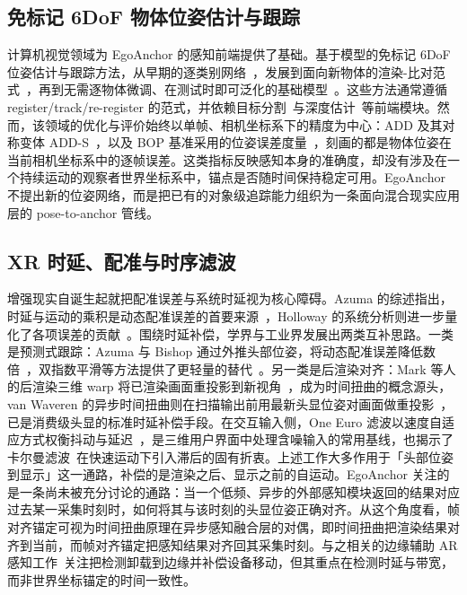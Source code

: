 \documentclass[review]{vgtc}
\begin{document}
\subsection{免标记 6DoF 物体位姿估计与跟踪}
计算机视觉领域为 EgoAnchor 的感知前端提供了基础。基于模型的免标记 6DoF 位姿估计与跟踪方法，从早期的逐类别网络~\cite{posecnn2017,densefusion2019}，发展到面向新物体的渲染-比对范式~\cite{cosypose2020,megapose2022}，再到无需逐物体微调、在测试时即可泛化的基础模型~\cite{foundationpose2023,bundlesdf2023}。这些方法通常遵循 register/track/re-register 的范式，并依赖目标分割~\cite{kirillov2023sam,cutie2024,sam3_2025,yoloe2025}与深度估计~\cite{foundationstereo2025}等前端模块。然而，该领域的优化与评价始终以单帧、相机坐标系下的精度为中心：ADD 及其对称变体 ADD-S~\cite{hinterstoisser2012add,posecnn2017}，以及 BOP 基准采用的位姿误差度量~\cite{hodan2020bop}，刻画的都是物体位姿在当前相机坐标系中的逐帧误差。这类指标反映感知本身的准确度，却没有涉及在一个持续运动的观察者世界坐标系中，锚点是否随时间保持稳定可用。EgoAnchor 不提出新的位姿网络，而是把已有的对象级追踪能力组织为一条面向混合现实应用层的 pose-to-anchor 管线。

\subsection{XR 时延、配准与时序滤波}
增强现实自诞生起就把配准误差与系统时延视为核心障碍。Azuma 的综述指出，时延与运动的乘积是动态配准误差的首要来源~\cite{azuma1997survey}，Holloway 的系统分析则进一步量化了各项误差的贡献~\cite{holloway1997registration}。围绕时延补偿，学界与工业界发展出两类互补思路。一类是预测式跟踪：Azuma 与 Bishop 通过外推头部位姿，将动态配准误差降低数倍~\cite{azuma1994improving}，双指数平滑等方法提供了更轻量的替代~\cite{laviola2003double}。另一类是后渲染对齐：Mark 等人的后渲染三维 warp 将已渲染画面重投影到新视角~\cite{mark1997postrendering}，成为时间扭曲的概念源头，van Waveren 的异步时间扭曲则在扫描输出前用最新头显位姿对画面做重投影~\cite{vanwaveren2016atw}，已是消费级头显的标准时延补偿手段。在交互输入侧，One Euro 滤波以速度自适应方式权衡抖动与延迟~\cite{casiez2012oneeuro}，是三维用户界面中处理含噪输入的常用基线，也揭示了卡尔曼滤波~\cite{kalman1960new}在快速运动下引入滞后的固有折衷。上述工作大多作用于「头部位姿到显示」这一通路，补偿的是渲染之后、显示之前的自运动。EgoAnchor 关注的是一条尚未被充分讨论的通路：当一个低频、异步的外部感知模块返回的结果对应过去某一采集时刻时，如何将其与该时刻的头显位姿正确对齐。从这个角度看，帧对齐锚定可视为时间扭曲原理在异步感知融合层的对偶，即时间扭曲把渲染结果对齐到当前，而帧对齐锚定把感知结果对齐回其采集时刻。与之相关的边缘辅助 AR 感知工作~\cite{liu2019edge,guan2022deepmix}关注把检测卸载到边缘并补偿设备移动，但其重点在检测时延与带宽，而非世界坐标锚定的时间一致性。
\end{document}
